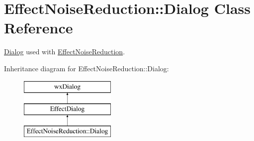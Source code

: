 \hypertarget{class_effect_noise_reduction_1_1_dialog}{}\section{Effect\+Noise\+Reduction\+:\+:Dialog Class Reference}
\label{class_effect_noise_reduction_1_1_dialog}


\hyperlink{class_effect_noise_reduction_1_1_dialog}{Dialog} used with \hyperlink{class_effect_noise_reduction}{Effect\+Noise\+Reduction}.  


Inheritance diagram for Effect\+Noise\+Reduction\+:\+:Dialog\+:\begin{figure}[H]
\begin{center}
\leavevmode
\includegraphics[height=3.000000cm]{class_effect_noise_reduction_1_1_dialog}
\end{center}
\end{figure}
